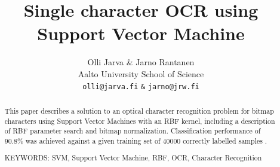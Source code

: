 \documentclass{netsec2012}
\begin{document}

\title{Single character OCR using Support Vector Machine}

\author{Olli Jarva \& Jarno Rantanen \\
        Aalto University School of Science \\
	\texttt{olli@jarva.fi} \texttt{\&} \texttt{jarno@jrw.fi}}
\maketitle


\begin{abstract}

This paper describes a solution to an optical character recognition problem for bitmap characters
using Support Vector Machines with an RBF kernel, including a description of RBF parameter search
and bitmap normalization.  Classification performance of 90.8\% was achieved against a given
training set of 40000 correctly labelled samples \cite{training_set}.

\vspace{3mm}
\noindent KEYWORDS: SVM, Support Vector Machine, RBF, OCR, Character Recognition

\end{abstract}





\end{document}

